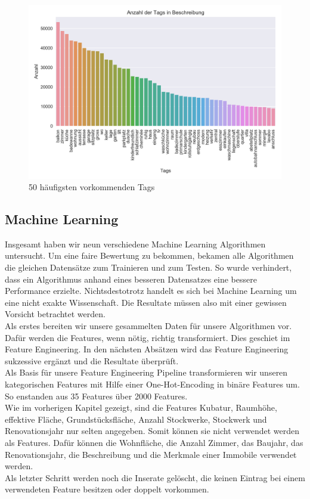 \begin{figure}[ht]
\centering
\includegraphics[width=\textwidth]{images/tags.png}
\caption[50 häufigsten vorkommenden Tags]{50 häufigsten vorkommenden Tags}%
\label{fig:tags}
\end{figure}
\newline
%
\subsection{Machine Learning}
Insgesamt haben wir neun verschiedene Machine Learning Algorithmen untersucht. Um eine faire Bewertung zu bekommen, bekamen alle Algorithmen die gleichen Datensätze zum Trainieren und zum Testen. So wurde verhindert, dass ein Algorithmus anhand eines besseren Datensatzes eine bessere Performance erzielte. Nichtsdestotrotz handelt es sich bei Machine Learning um eine nicht exakte Wissenschaft. Die Resultate müssen also mit einer gewissen Vorsicht betrachtet werden.\\[2ex]
%
Als erstes bereiten wir unsere gesammelten Daten für unsere Algorithmen vor. Dafür werden die Features, wenn nötig, richtig transformiert. Dies geschiet im Feature Engineering. In den nächsten Absätzen wird das Feature Engineering sukzessive ergänzt und die Resultate überprüft.\\[2ex]
%
Als Basis für unsere Feature Engineering Pipeline transformieren wir unseren kategorischen Features mit Hilfe einer One-Hot-Encoding in binäre Features um. So enstanden aus 35 Features über 2000 Features.\\
Wie im vorherigen Kapitel gezeigt, sind die Features Kubatur, Raumhöhe, effektive Fläche, Grundstücksfläche, Anzahl Stockwerke, Stockwerk und Renovationsjahr nur selten angegeben. Somit können sie nicht verwendet werden als Features. Dafür können die Wohnfläche, die Anzahl Zimmer, das Baujahr, das Renovationsjahr, die Beschreibung und die Merkmale einer Immobile verwendet werden.\\ 
Als letzter Schritt werden noch die Inserate gelöscht, die keinen Eintrag bei einem verwendeten Feature besitzen oder doppelt vorkommen.
%
